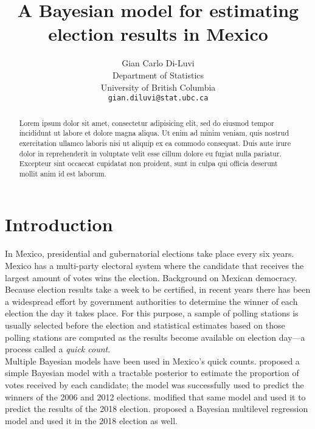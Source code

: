 \documentclass{article}
\title{A Bayesian model for estimating election results in Mexico}
\author{%
  Gian Carlo Di-Luvi \\
  Department of Statistics\\
  University of British Columbia \\
  \texttt{gian.diluvi@stat.ubc.ca}
}
\begin{document}
\maketitle

\begin{abstract}
  Lorem ipsum dolor sit amet, consectetur adipisicing elit, sed do eiusmod tempor incididunt ut labore et dolore magna aliqua. Ut enim ad minim veniam, quis nostrud exercitation ullamco laboris nisi ut aliquip ex ea commodo consequat. Duis aute irure dolor in reprehenderit in voluptate velit esse cillum dolore eu fugiat nulla pariatur. Excepteur sint occaecat cupidatat non proident, sunt in culpa qui officia deserunt mollit anim id est laborum.
\end{abstract}



\section{Introduction}


In Mexico, presidential and gubernatorial elections take place every six years. Mexico has a multi-party electoral system where the candidate that receives the largest amount of votes wins the election. Background on Mexican democracy.
\\



Because election results take a week to be certified, in recent years there has been a widespread effort by government authorities to determine the winner of each election the day it takes place. For this purpose, a sample of polling stations is usually selected before the election and statistical estimates based on those polling stations are computed as the results become available on election day---a process called a \textit{quick count}.
\\



Multiple Bayesian models have been used in Mexico's quick counts. \citet{mendoza-nieto2016} proposed a simple Bayesian model with a tractable posterior to estimate the proportion of votes received by each candidate; the model was successfully used to predict the winners of the 2006 and 2012 elections. \citet{diluvi2018} modified that same model and used it to predict the results of the 2018 election. \citet{anzarut2018} proposed a Bayesian multilevel regression model and used it in the 2018 election as well.
\\
\end{document}

